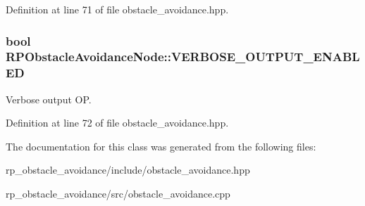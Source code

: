 \-Definition at line 71 of file obstacle\-\_\-avoidance.\-hpp.

\hypertarget{class_r_p_obstacle_avoidance_node_a16106e57285f417f8c883c3a882aaa45}{
\subsubsection[{\-V\-E\-R\-B\-O\-S\-E\-\_\-\-O\-U\-T\-P\-U\-T\-\_\-\-E\-N\-A\-B\-L\-E\-D}]{\setlength{\rightskip}{0pt plus 5cm}bool {\bf \-R\-P\-Obstacle\-Avoidance\-Node\-::\-V\-E\-R\-B\-O\-S\-E\-\_\-\-O\-U\-T\-P\-U\-T\-\_\-\-E\-N\-A\-B\-L\-E\-D}}}\label{class_r_p_obstacle_avoidance_node_a16106e57285f417f8c883c3a882aaa45}
\-Verbose output \-O\-P. 

\-Definition at line 72 of file obstacle\-\_\-avoidance.\-hpp.



\-The documentation for this class was generated from the following files\-:\begin{DoxyCompactItemize}
\item 
rp\-\_\-obstacle\-\_\-avoidance/include/obstacle\-\_\-avoidance.\-hpp\item 
rp\-\_\-obstacle\-\_\-avoidance/src/obstacle\-\_\-avoidance.\-cpp\end{DoxyCompactItemize}
